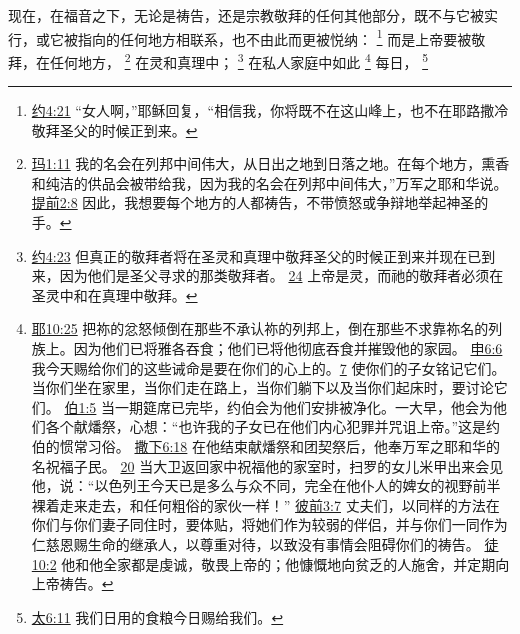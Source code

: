 \documentclass[12pt, a4paper, oneside]{ctexart}
\newcounter{parnum}[section]
\newcommand{\N}{%
   \noindent\refstepcounter{parnum}%
    \makebox[\parindent][l]{\textbf{\arabic{parnum}.}}}
\begin{document}
\N 现在，在福音之下，无论是祷告，还是宗教敬拜的任何其他部分，既不与它被实行，或它被指向的任何地方相联系，也不由此而更被悦纳：
	\footnote {
		\href{https://biblehub.com/john/4-21.htm}{约4:21} “女人啊，”耶稣回复，“相信我，你将既不在这山峰上，也不在耶路撒冷敬拜圣父的时候正到来。
	}
	而是上帝要被敬拜，在任何地方，
	\footnote {
		\href{https://biblehub.com/malachi/1-11.htm}{玛1:11} 我的名会在列邦中间伟大，从日出之地到日落之地。在每个地方，熏香和纯洁的供品会被带给我，因为我的名会在列邦中间伟大，”万军之耶和华说。
		\href{https://biblehub.com/1_timothy/2-8.htm}{提前2:8} 因此，我想要每个地方的人都祷告，不带愤怒或争辩地举起神圣的手。
	}
	在灵和真理中；
	\footnote {
		\href{https://biblehub.com/john/4-23.htm}{约4:23} 但真正的敬拜者将在圣灵和真理中敬拜圣父的时候正到来并现在已到来，因为他们是圣父寻求的那类敬拜者。
		\href{https://biblehub.com/john/4-24.htm}{24} 上帝是灵，而祂的敬拜者必须在圣灵中和在真理中敬拜。
	}
	在私人家庭中如此
	\footnote {
		\href{https://biblehub.com/jeremiah/10-25.htm}{耶10:25} 把祢的忿怒倾倒在那些不承认祢的列邦上，倒在那些不求靠祢名的列族上。因为他们已将雅各吞食；他们已将他彻底吞食并摧毁他的家园。
		\href{https://biblehub.com/deuteronomy/6-6.htm}{申6:6} 我今天赐给你们的这些诫命是要在你们的心上的。\href{https://biblehub.com/deuteronomy/6-7.htm}{7} 使你们的子女铭记它们。当你们坐在家里，当你们走在路上，当你们躺下以及当你们起床时，要讨论它们。
		\href{https://biblehub.com/job/1-5.htm}{伯1:5} 当一期筵席已完毕，约伯会为他们安排被净化。一大早，他会为他们各个献燔祭，心想：“也许我的子女已在他们内心犯罪并咒诅上帝。”这是约伯的惯常习俗。
		\href{https://biblehub.com/2_samuel/6-18.htm}{撒下6:18} 在他结束献燔祭和团契祭后，他奉万军之耶和华的名祝福子民。
		\href{https://biblehub.com/2_samuel/6-20.htm}{20} 当大卫返回家中祝福他的家室时，扫罗的女儿米甲出来会见他，说：“以色列王今天已是多么与众不同，完全在他仆人的婢女的视野前半裸着走来走去，和任何粗俗的家伙一样！”
		\href{https://biblehub.com/1_peter/3-7.htm}{彼前3:7} 丈夫们，以同样的方法在你们与你们妻子同住时，要体贴，将她们作为较弱的伴侣，并与你们一同作为仁慈恩赐生命的继承人，以尊重对待，以致没有事情会阻碍你们的祷告。
		\href{https://biblehub.com/acts/10-2.htm}{徒10:2} 他和他全家都是虔诚，敬畏上帝的；他慷慨地向贫乏的人施舍，并定期向上帝祷告。
	}
	每日，
	\footnote {
		\href{https://biblehub.com/matthew/6-11.htm}{太6:11} 我们日用的食粮今日赐给我们。
	}
\end{document}
